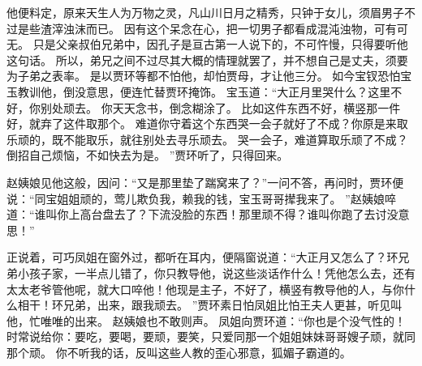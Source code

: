 他便料定，原来天生人为万物之灵，凡山川日月之精秀，只钟于女儿，须眉男子不过是些渣滓浊沫而已。
因有这个呆念在心，把一切男子都看成混沌浊物，可有可无。
只是父亲叔伯兄弟中，因孔子是亘古第一人说下的，不可忤慢，只得要听他这句话。
所以，弟兄之间不过尽其大概的情理就罢了，并不想自己是丈夫，须要为子弟之表率。
是以贾环等都不怕他，却怕贾母，才让他三分。
如今宝钗恐怕宝玉教训他，倒没意思，便连忙替贾环掩饰。
宝玉道：“大正月里哭什么？这里不好，你别处顽去。
你天天念书，倒念糊涂了。
比如这件东西不好，横竖那一件好，就弃了这件取那个。
难道你守着这个东西哭一会子就好了不成？你原是来取乐顽的，既不能取乐，就往别处去寻乐顽去。
哭一会子，难道算取乐顽了不成？倒招自己烦恼，不如快去为是。
”贾环听了，只得回来。
\par
赵姨娘见他这般，因问：“又是那里垫了踹窝来了？”一问不答，再问时，贾环便说：“同宝姐姐顽的，莺儿欺负我，赖我的钱，宝玉哥哥撵我来了。
”赵姨娘啐道：“谁叫你上高台盘去了？下流没脸的东西！那里顽不得？谁叫你跑了去讨没意思！”\par
正说着，可巧凤姐在窗外过，都听在耳内，便隔窗说道：“大正月又怎么了？环兄弟小孩子家，一半点儿错了，你只教导他，说这些淡话作什么！凭他怎么去，还有太太老爷管他呢，就大口啐他！他现是主子，不好了，横竖有教导他的人，与你什么相干！环兄弟，出来，跟我顽去。
”贾环素日怕凤姐比怕王夫人更甚，听见叫他，忙唯唯的出来。
赵姨娘也不敢则声。
凤姐向贾环道：“你也是个没气性的！时常说给你：要吃，要喝，要顽，要笑，只爱同那一个姐姐妹妹哥哥嫂子顽，就同那个顽。
你不听我的话，反叫这些人教的歪心邪意，狐媚子霸道的。
